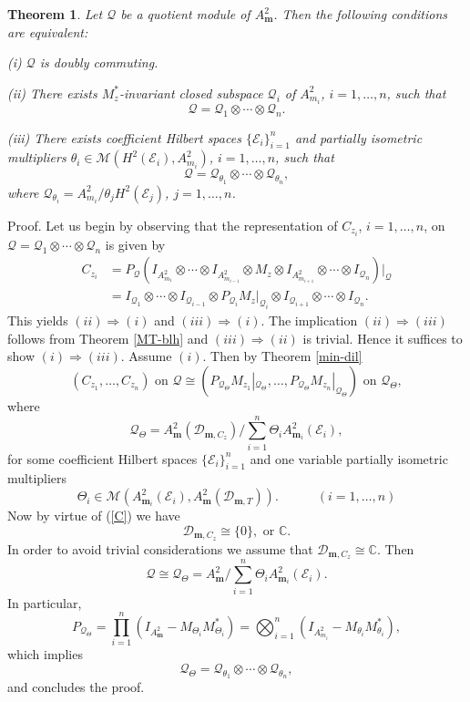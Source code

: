 \documentclass[12pt]{amsart}
\newtheorem{Theorem}{\sc Theorem}[section]
\begin{document}
\begin{Theorem}
Let ${\mathcal{Q}}$ be a quotient module of $A^2_{\bm{m}}$. Then the following
conditions are equivalent:

(i) ${\mathcal{Q}}$ is doubly commuting.

(ii) There exists $M_z^*$-invariant closed subspace ${\mathcal{Q}}_i$ of
$A^2_{m_i}$, $i = 1, \ldots, n$, such that \[{\mathcal{Q}} = {\mathcal{Q}}_1 \otimes
\cdots \otimes {\mathcal{Q}}_n.\]

(iii) There exists coefficient Hilbert spaces $\{{\mathcal{E}}_i\}_{i=1}^n$
and partially isometric multipliers $\theta_i \in {\mathcal{M}}(H^2({\mathcal{E}}_i),
A^2_{m_i})$, $i = 1, \ldots, n$, such that \[{\mathcal{Q}} = {\mathcal{Q}}_{\theta_1}
\otimes \cdots \otimes {\mathcal{Q}}_{\theta_n},\]where ${\mathcal{Q}}_{\theta_i} =
A^2_{m_i}/ \theta_j H^2({\mathcal{E}}_j)$, $j = 1, \ldots, n$.
\end{Theorem}
{\noindent}\textsf{Proof.} Let us begin by observing that the representation
of $C_{z_i}$, $i = 1, \ldots, n$, on ${\mathcal{Q}} = {\mathcal{Q}}_1 \otimes \cdots
\otimes {\mathcal{Q}}_n$ is given by
\[\begin{split} C_{z_i} & = P_{\mathcal{Q}} (I_{A^2_{m_1}} \otimes \cdots \otimes I_{A^2_{m_{i-1}}}
\otimes M_z \otimes I_{A^2_{m_{i+1}}} \otimes \cdots \otimes
I_{{\mathcal{Q}}_n})|_{\mathcal{Q}} \\ & = I_{{\mathcal{Q}}_1} \otimes \cdots \otimes
I_{{\mathcal{Q}}_{i-1}} \otimes P_{{\mathcal{Q}}_i} M_z|_{{\mathcal{Q}}_i} \otimes
I_{{\mathcal{Q}}_{i+1}} \otimes \cdots \otimes I_{{\mathcal{Q}}_n}.\end{split}\]This
yields $(ii) {\Rightarrow} (i)$ and $(iii) {\Rightarrow} (i)$. The implication $(ii)
{\Rightarrow} (iii)$ follows from Theorem \ref{MT-blh} and $(iii) {\Rightarrow} (ii)$ is
trivial. Hence it suffices to show $(i) \Rightarrow (iii)$. Assume
$(i)$. Then by Theorem \ref{min-dil} \[(C_{z_1}, \ldots, C_{z_n})
\mbox{~on~} {\mathcal{Q}} \cong (P_{{\mathcal{Q}}_{\Theta}} M_{z_1}|_{{\mathcal{Q}}_{\Theta}},
\ldots, P_{{\mathcal{Q}}_{\Theta}} M_{z_n}|_{{\mathcal{Q}}_{\Theta}}) \mbox{~on~}
{\mathcal{Q}}_{\Theta},\]where \[{\mathcal{Q}}_{\Theta} =
A^2_{\bm{m}}({\mathcal{D}}_{{\bm{m}},C_z})/\sum_{i=1}^n \Theta_i
A^2_{{\bm{m}}_i}({\mathcal{E}}_i),\]for some coefficient Hilbert spaces
$\{{\mathcal{E}}_i\}_{i=1}^n$ and one variable partially isometric
multipliers \[\Theta_i \in {\mathcal{M}}(A^2_{{\bm{m}}_i}({\mathcal{E}}_i),
A^2_{\bm{m}}({\mathcal{D}}_{{\bm{m}},T})). \quad \quad \quad(i = 1,\ldots, n)\]Now by
virtue of (\ref{C}) we have \[{\mathcal{D}}_{{\bm{m}}, C_z} \cong \{0\},
\mbox{~or~} \mathbb{C}.\] In order to avoid trivial considerations
we assume that ${\mathcal{D}}_{{\bm{m}},C_z} \cong \mathbb{C}$. Then
\[{\mathcal{Q}} \cong {\mathcal{Q}}_{\Theta} = A^2_{\bm{m}}/ \sum_{i=1}^n \Theta_i
A^2_{{\bm{m}}_i}({\mathcal{E}}_i).\]In particular, \[P_{{\mathcal{Q}}_{\Theta}} =
\prod_{i=1}^n (I_{A^2_{\bm{m}}} - M_{\Theta_i} M_{\Theta_i}^*) =
\bigotimes_{i=1}^n (I_{A^2_{m_i}} - M_{\theta_i}
M_{\theta_i}^*),\]which implies
\[{\mathcal{Q}}_{\Theta} = {\mathcal{Q}}_{\theta_1} \otimes \cdots \otimes
{\mathcal{Q}}_{\theta_n},\]and concludes the proof. {\hfill \vrule height6pt width 6pt depth 0pt}
\end{document}
